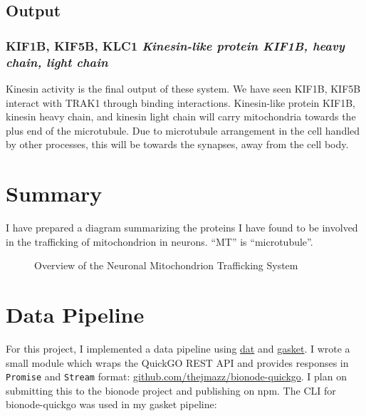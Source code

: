 \subsection{Output}

\subsubsection{KIF1B, KIF5B, KLC1 \textit{Kinesin-like protein KIF1B, heavy chain, light chain}}

Kinesin activity is the final output of these system. We have seen KIF1B, KIF5B
interact with TRAK1 through binding interactions. Kinesin-like protein KIF1B,
kinesin heavy chain, and kinesin light chain will carry mitochondria towards
the plus end of the microtubule. Due to microtubule arrangement in the cell
handled by other processes, this will be towards the synapses, away from the
cell body.

\section{Summary}

I have prepared a diagram summarizing the proteins I have found to be involved
in the trafficking of mitochondrion in neurons. ``MT'' is ``microtubule''.

\begin{figure}[h!]
  
  \caption{Overview of the Neuronal Mitochondrion Trafficking System}
\end{figure}

\section{Data Pipeline}

For this project, I implemented a data pipeline using
\href{http://dat-data.com}{dat} and
\href{https://github.com/datproject/gasket}{gasket}. I wrote a small module
which wraps the QuickGO REST API and provides responses in \texttt{Promise} and
\texttt{Stream} format:
\href{https://github.com/thejmazz/bionode-quickgo}{github.com/thejmazz/bionode-quickgo}.
I plan on submitting this to the bionode project and publishing on npm. The CLI
for bionode-quickgo was used in my gasket pipeline:

\inputminted[fontsize=\small]{json}{"../gasket.json"}

